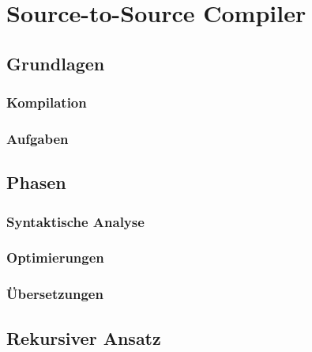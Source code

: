 \chapter{Source-to-Source Compiler}

\section{Grundlagen}
\subsection{Kompilation}
\subsection{Aufgaben}

\section{Phasen}
\subsection{Syntaktische Analyse}
\subsection{Optimierungen}
\subsection{Übersetzungen}

\section{Rekursiver Ansatz}